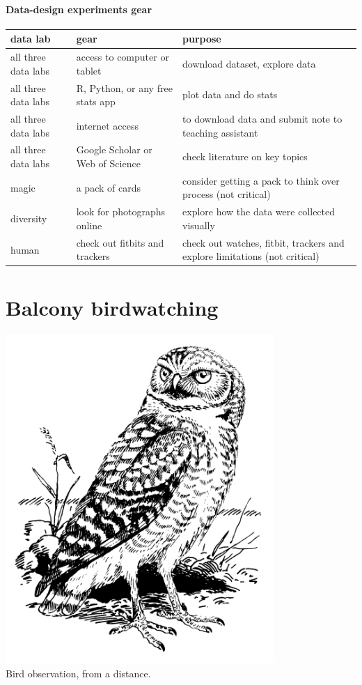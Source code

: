 \documentclass[
]{book}
\begin{document}
\hypertarget{data-design-experiments-gear}{%
\subsubsection*{Data-design experiments gear}\label{data-design-experiments-gear}}

\begin{tabular}{lll}
\toprule
data lab & gear & purpose\\
\midrule
all three data labs & access to computer or tablet & download dataset, explore data\\
all three data labs & R, Python, or any free stats app & plot data and do stats\\
all three data labs & internet access & to download data and submit note to teaching assistant\\
all three data labs & Google Scholar or Web of Science & check literature on key topics\\
magic & a pack of cards & consider getting a pack to think over process (not critical)\\
\addlinespace
diversity & look for photographs online & explore how the data were collected visually\\
human & check out fitbits and trackers & check out watches, fitbit, trackers and explore limitations (not critical)\\
\bottomrule
\end{tabular}

\hypertarget{birds}{%
\chapter{Balcony birdwatching}\label{birds}}

\includegraphics[width=4in,height=\textheight]{./owl.png}\\
Bird observation, from a distance.
\end{document}
